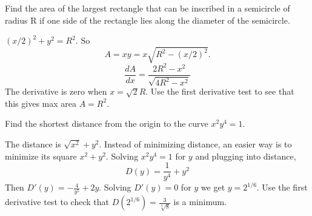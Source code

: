 \documentclass[calc1-main.tex]{subfiles}
\begin{document}
\begin{example}
  Find the area of the largest rectangle that can be inscribed in a semicircle of radius R if one side of the rectangle lies along the diameter of the semicircle.

\end{example}

\begin{minipage}{0.5\textwidth}
  \begin{solution}
    $(x/2)^2 + y^2 = R^2$. So
    \[
      A = x y = x \sqrt{R^2 - (x/2)^2}.
    \]
    \[
      \frac{dA}{dx} = \frac{2R^2 - x^2}{\sqrt{4R^2-x^2}}
    \]
    The derivative is zero when $x=\sqrt{2}R$. Use the first derivative test to see that this gives max area $A = R^2$.
  \end{solution}
\end{minipage}%
\begin{minipage}{0.5\textwidth}
  \centering
\end{minipage}

\begin{example}
  Find the shortest distance from the origin to the curve $x^2 y^4 = 1$.
\end{example}
\begin{solution}
  The distance is $\sqrt{x^2} + y^2$. Instead of minimizing distance, an easier way is to minimize its square $x^2 + y^2$. Solving $x^2 y^4 = 1$ for $y$ and plugging into distance,
  \[
    D(y) = \frac{1}{y^4} + y^2
  \]
  Then $D'(y) = -\frac{4}{y^5} + 2y$. Solving $D'(y) = 0$ for $y$ we get $y = 2^{1/6}$. Use the first derivative test to check that $D(2^{1/6}) = \frac{3}{\sqrt[3]{8}}$ is a minimum.
\end{solution}
\end{document}
